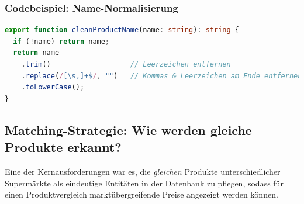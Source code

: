 \documentclass[12pt, a4paper]{report} %
\begin{document}
\subsubsection{Codebeispiel: Name-Normalisierung}
\begin{lstlisting}[language=TypeScript, caption={Vereinheitlichung von Produktnamen}]
export function cleanProductName(name: string): string {
  if (!name) return name;
  return name
    .trim()                   // Leerzeichen entfernen
    .replace(/[\s,]+$/, "")   // Kommas & Leerzeichen am Ende entfernen
    .toLowerCase();
}
\end{lstlisting}

\subsection{Matching-Strategie: Wie werden gleiche Produkte erkannt?}

Eine der Kernausforderungen war es, die \emph{gleichen} Produkte unterschiedlicher Supermärkte als eindeutige Entitäten in der Datenbank zu pflegen, sodass für einen Produktvergleich marktübergreifende Preise angezeigt werden können.
\end{document}
